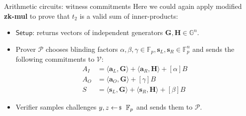 \documentclass{zkdl-presentation-template}
\begin{document}
    \begin{frame}{Arithmetic circuits: witness commitments}
        Here we could again apply modified \textbf{zk-mul} to prove that $t_2$ is a valid sum of inner-products:
        \begin{itemize}
            \item $\mathsf{Setup}$: returns vectors of independent generators $\mathbf{G,H} \in \mathbb{G}^n$.\pause
            \item Prover $\mathcal{P}$ chooses blinding factors $\alpha, \beta, \gamma \in \mathbb{F}_p, \mathbf{s}_L, \mathbf{s}_R \in \mathbb{F}_p^n$ and sends the following commitments to $\mathcal{V}$:
            \begin{equation*}
                \begin{aligned}
                    A_I &= \langle \mathbf{a}_L, \mathbf{G} \rangle + \langle \mathbf{a}_R, \mathbf{H} \rangle + [\alpha]B\\
                    A_O &= \langle \mathbf{a}_O, \mathbf{G} \rangle + [\gamma]B\\
                    S &= \langle \mathbf{s}_L, \mathbf{G} \rangle + \langle \mathbf{s}_R, \mathbf{H} \rangle + [\beta]B
                \end{aligned}
            \end{equation*}
            \pause
            \item Verifier samples challenges $y,z \leftarrowS \mathbb{F}_p$ and sends them to $\mathcal{P}$.
        \end{itemize}
    \end{frame}
\end{document}
